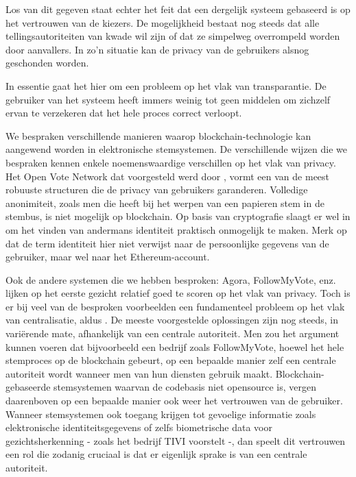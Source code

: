 		Los van dit gegeven staat echter het feit dat een dergelijk systeem gebaseerd is op het vertrouwen van de kiezers. De mogelijkheid bestaat nog steeds dat alle tellingsautoriteiten van kwade wil zijn of dat ze simpelweg overrompeld worden door aanvallers. In zo’n situatie kan de privacy van de gebruikers alsnog geschonden worden. ~\autocite{McCorry2017}
		
		In essentie gaat het hier om een probleem op het vlak van transparantie. De gebruiker van het systeem heeft immers weinig tot geen middelen om zichzelf ervan te verzekeren dat het hele proces correct verloopt. ~\autocite{McCorry2017}
		
		We bespraken verschillende manieren waarop blockchain-technologie kan aangewend worden in elektronische stemsystemen. De verschillende wijzen die we bespraken kennen enkele noemenswaardige verschillen op het vlak van privacy. Het Open Vote Network dat voorgesteld werd door \textcite{McCorry2017}, vormt een van de meest robuuste structuren die de privacy van gebruikers garanderen. Volledige anonimiteit, zoals men die heeft bij het werpen van een papieren stem in de stembus, is niet mogelijk op blockchain. Op basis van cryptografie slaagt \textcite{McCorry2017} er wel in om het vinden van andermans identiteit praktisch onmogelijk te maken. Merk op dat  de term identiteit hier niet verwijst naar de persoonlijke gegevens van de gebruiker, maar wel naar het Ethereum-account.
		
		Ook  de andere systemen die we hebben besproken: Agora, FollowMyVote, enz. lijken op het eerste gezicht relatief goed te scoren op het vlak van privacy. Toch is er bij veel van de besproken voorbeelden een fundamenteel probleem op het vlak van centralisatie, aldus \textcite{McCorry2017}. De meeste voorgestelde oplossingen zijn nog steeds, in variërende mate, afhankelijk van een centrale autoriteit. Men zou het argument kunnen voeren dat bijvoorbeeld een bedrijf zoals FollowMyVote, hoewel het hele stemproces op de blockchain gebeurt, op een bepaalde manier zelf een centrale autoriteit wordt wanneer men van hun diensten gebruik maakt. Blockchain-gebaseerde stemsystemen waarvan de codebasis niet opensource is, vergen daarenboven op een bepaalde manier ook weer het vertrouwen van de gebruiker. Wanneer stemsystemen ook toegang krijgen tot gevoelige informatie zoals elektronische identiteitsgegevens of zelfs biometrische data voor gezichtsherkenning - zoals het bedrijf TIVI voorstelt -, dan speelt dit vertrouwen een rol die zodanig cruciaal is dat er eigenlijk sprake is van een centrale autoriteit.
